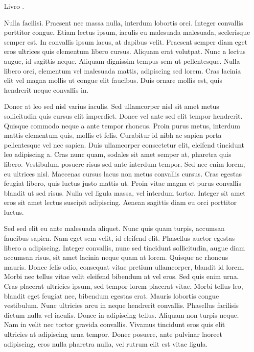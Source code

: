 \documentclass[qual, classic, a4paper]{ufbathesis}
\begin{document}
Livro \cite{demeyer2008}.

Nulla facilisi. Praesent nec massa nulla, interdum lobortis orci. Integer convallis porttitor congue. Etiam lectus ipsum, iaculis eu malesuada malesuada, scelerisque semper est. In convallis ipsum lacus, at dapibus velit. Praesent semper diam eget eros ultrices quis elementum libero cursus. Aliquam erat volutpat. Nunc a lectus augue, id sagittis neque. Aliquam dignissim tempus sem ut pellentesque. Nulla libero orci, elementum vel malesuada mattis, adipiscing sed lorem. Cras lacinia elit vel magna mollis ut congue elit faucibus. Duis ornare mollis est, quis hendrerit neque convallis in.

Donec at leo sed nisl varius iaculis. Sed ullamcorper nisl sit amet metus sollicitudin quis cursus elit imperdiet. Donec vel ante sed elit tempor hendrerit. Quisque commodo neque a ante tempor rhoncus. Proin purus metus, interdum mattis elementum quis, mollis et felis. Curabitur id nibh ac sapien porta pellentesque vel nec sapien. Duis ullamcorper consectetur elit, eleifend tincidunt leo adipiscing a. Cras nunc quam, sodales sit amet semper at, pharetra quis libero. Vestibulum posuere risus sed ante interdum tempor. Sed nec enim lorem, eu ultrices nisl. Maecenas cursus lacus non metus convallis cursus. Cras egestas feugiat libero, quis luctus justo mattis ut. Proin vitae magna et purus convallis blandit ut sed risus. Nulla vel ligula massa, vel interdum tortor. Integer sit amet eros sit amet lectus suscipit adipiscing. Aenean sagittis diam eu orci porttitor luctus.

Sed sed elit eu ante malesuada aliquet. Nunc quis quam turpis, accumsan faucibus sapien. Nam eget sem velit, id eleifend elit. Phasellus auctor egestas libero a adipiscing. Integer convallis, nunc sed tincidunt sollicitudin, augue diam accumsan risus, sit amet lacinia neque quam at lorem. Quisque ac rhoncus mauris. Donec felis odio, consequat vitae pretium ullamcorper, blandit id lorem. Morbi nec tellus vitae velit eleifend bibendum at vel eros. Sed quis enim urna. Cras placerat ultricies ipsum, sed tempor lorem placerat vitae. Morbi tellus leo, blandit eget feugiat nec, bibendum egestas erat. Mauris lobortis congue vestibulum. Nunc ultricies arcu in neque hendrerit convallis. Phasellus facilisis dictum nulla vel iaculis. Donec in adipiscing tellus. Aliquam non turpis neque. Nam in velit nec tortor gravida convallis. Vivamus tincidunt eros quis elit ultricies at adipiscing urna tempor. Donec posuere, ante pulvinar laoreet adipiscing, eros nulla pharetra nulla, vel rutrum elit est vitae ligula.
\end{document}
